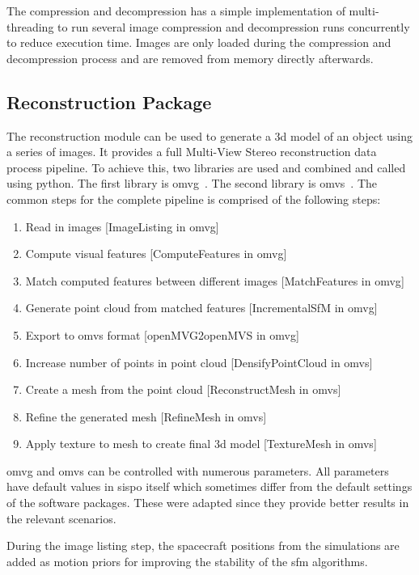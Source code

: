 The compression and decompression has a simple implementation of multi-threading to run several image compression and decompression runs concurrently to reduce execution time. Images are only loaded during the compression and decompression process and are removed from memory directly afterwards.

\subsection{Reconstruction Package}
The reconstruction module can be used to generate a \gls{3d} model of an object using a series of images. It provides a full Multi-View Stereo reconstruction data process pipeline. To achieve this, two libraries are used and combined and called using python. The first library is \gls{omvg}~\cite{openMVG}. The second library is \gls{omvs}~\cite{openMVS}. 
The common steps for the complete pipeline is comprised of the following steps:
\begin{enumerate}
    \item Read in images [ImageListing in \gls{omvg}]
    \item Compute visual features [ComputeFeatures in \gls{omvg}]
    \item Match computed features between different images [MatchFeatures in \gls{omvg}]
    \item Generate point cloud from matched features [IncrementalSfM in \gls{omvg}]
    \item Export to \gls{omvs} format [openMVG2openMVS in \gls{omvg}]
    \item Increase number of points in point cloud [DensifyPointCloud in \gls{omvs}]
    \item Create a mesh from the point cloud [ReconstructMesh in \gls{omvs}]
    \item Refine the generated mesh [RefineMesh in \gls{omvs}]
    \item Apply texture to mesh to create final \gls{3d} model [TextureMesh in \gls{omvs}]
\end{enumerate}

\gls{omvg} and \gls{omvs} can be controlled with numerous parameters. All parameters have default values in \gls{sispo} itself which sometimes differ from the default settings of the software packages. These were adapted since they provide better results in the relevant scenarios.

During the image listing step, the spacecraft positions from the simulations are added as motion priors for improving the stability of the \gls{sfm} algorithms.

